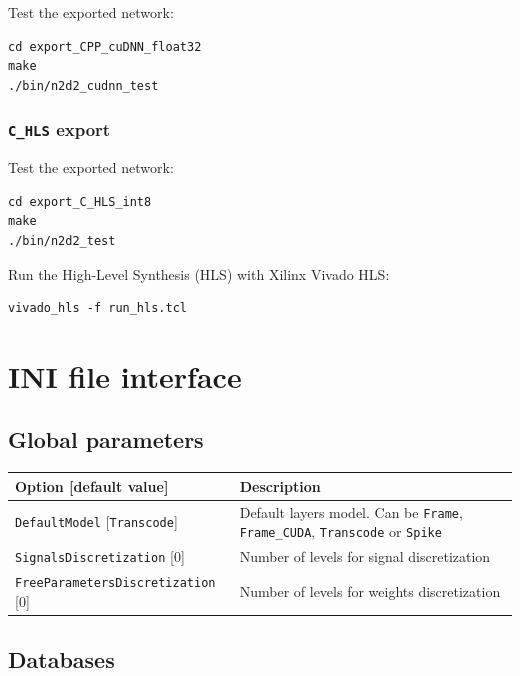 \documentclass[a4paper,11pt,oneside]{article}
\newcommand{\iponly}{\reversemarginpar
    \marginnote{\color{listletiblue}\normalfont\scriptsize
    {\ttfamily{}\hyperref[sec:N2D2-IP]{\color{listletiblue}N2D2 IP}} \emph{only}}}
\begin{document}
Test the exported network:
\begin{lstlisting}
cd export_CPP_cuDNN_float32
make
./bin/n2d2_cudnn_test
\end{lstlisting}

\subsubsection{\texorpdfstring{%
\lstinline[basicstyle=\ttfamily\bfseries]!C_HLS! export\protect\iponly}
{C\_HLS export}}

Test the exported network:
\begin{lstlisting}
cd export_C_HLS_int8
make
./bin/n2d2_test
\end{lstlisting}

Run the High-Level Synthesis (HLS) with Xilinx\textregistered{}
Vivado\textregistered{} HLS:
\begin{lstlisting}
vivado_hls -f run_hls.tcl
\end{lstlisting}

\clearpage

\section{INI file interface}

\subsection{Global parameters}

\begin{center}
 \begin{tabular}{| p{5cm} | p{10cm} | }
 \hline
 Option [default value] & Description\\
 \hline\hline
  \lstinline!DefaultModel! [\lstinline!Transcode!] & Default layers model.
  Can be \lstinline!Frame!, \lstinline!Frame_CUDA!, \lstinline!Transcode!
  or \lstinline!Spike! \\
  \lstinline!SignalsDiscretization! [0] & Number of levels for signal
  discretization \\
  \lstinline!FreeParametersDiscretization! [0] & Number of levels for weights discretization \\
 \hline
\end{tabular}
\end{center}


\subsection{Databases}
\end{document}
